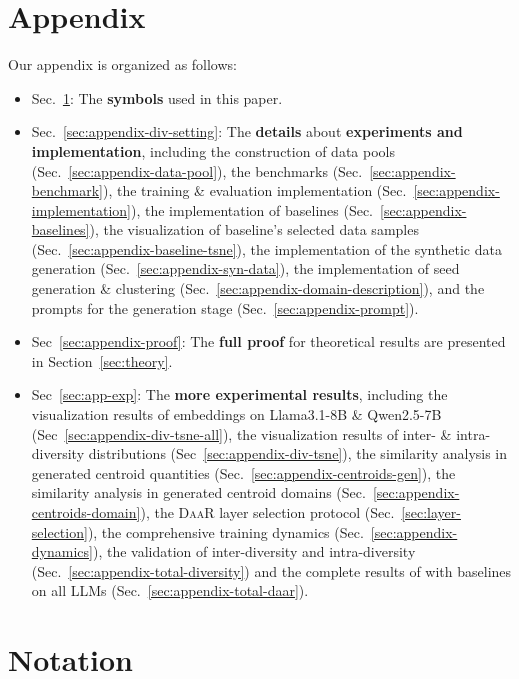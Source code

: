 \appendix
\onecolumn

\section*{Appendix}
Our appendix is organized as follows:
\begin{itemize}
    \item Sec.~\ref{sec:app:notations}: The \textbf{symbols} used in this paper.
    \item Sec.~\ref{sec:appendix-div-setting}: The \textbf{details} about \textbf{experiments and \ours implementation}, including the construction of data pools (Sec.~\ref{sec:appendix-data-pool}), the benchmarks (Sec.~\ref{sec:appendix-benchmark}), the training \& evaluation implementation (Sec.~\ref{sec:appendix-implementation}), the implementation of baselines (Sec.~\ref{sec:appendix-baselines}), the visualization of baseline's selected data samples (Sec.~\ref{sec:appendix-baseline-tsne}), the implementation of the synthetic data generation (Sec.~\ref{sec:appendix-syn-data}), the implementation of seed generation \& clustering (Sec.~\ref{sec:appendix-domain-description}), and the prompts for the generation stage (Sec.~\ref{sec:appendix-prompt}).
    \item Sec~\ref{sec:appendix-proof}: The \textbf{full proof} for theoretical results are presented in Section~\ref{sec:theory}.
    \item Sec~\ref{sec:app-exp}: The \textbf{more experimental results}, including the visualization results of embeddings on Llama3.1-8B \& Qwen2.5-7B (Sec~\ref{sec:appendix-div-tsne-all}), the visualization results of inter- \& intra-diversity distributions (Sec~\ref{sec:appendix-div-tsne}), the similarity analysis in generated centroid quantities (Sec.~\ref{sec:appendix-centroids-gen}), the similarity analysis in generated centroid domains (Sec.~\ref{sec:appendix-centroids-domain}), the \textsc{DaaR} layer selection protocol (Sec.~\ref{sec:layer-selection}), the comprehensive training dynamics (Sec.~\ref{sec:appendix-dynamics}), the validation of inter-diversity and intra-diversity (Sec.~\ref{sec:appendix-total-diversity}) and the complete results of \ours with baselines on all LLMs (Sec.~\ref{sec:appendix-total-daar}).
\end{itemize}

\section{Notation}\label{sec:app:notations}

